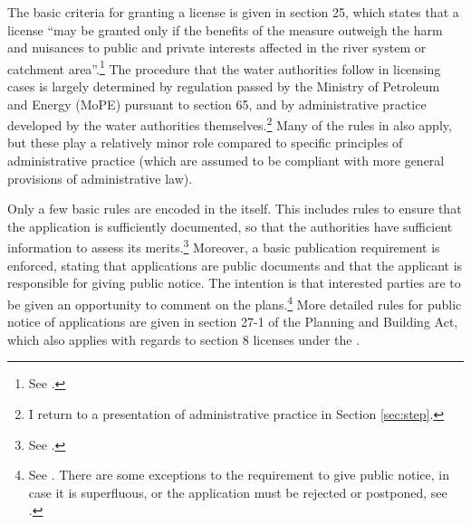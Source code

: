 The basic criteria for granting a license is given in section 25, which states that a license ``may be granted only if the benefits of the measure outweigh the harm and nuisances to public and private interests affected in the river system or catchment area''.\footnote{See \cite[25]{wra00}.} The procedure that the water authorities follow in licensing cases is largely determined by regulation passed by the Ministry of Petroleum and Energy (MoPE) pursuant to section 65, and by administrative practice developed by the water authorities themselves.\footnote{I return to a presentation of administrative practice in Section \ref{sec:step}.} Many of the rules in \cite{ac67} also apply, but these play a relatively minor role compared to specific principles of administrative practice (which are assumed to be compliant with more general provisions of administrative law).

Only a few basic rules are encoded in the \cite{wra00} itself. This includes rules to ensure that the application is sufficiently documented, so that the authorities have sufficient information to assess its merits.\footnote{See \cite[23]{wra00}.} Moreover, a basic publication requirement is enforced, stating that applications are public documents and that the applicant is responsible for giving public notice. The intention is that interested parties are to be given an opportunity to comment on the plans.\footnote{See \cite[24]{wra00}. There are some exceptions to the requirement to give public notice, in case it is superfluous, or the application must be rejected or postponed, see \cite[24a-24c]{wra00}.} More detailed rules for public notice of applications are given in section 27-1 of the Planning and Building Act, which also applies with regards to section 8 licenses under the \cite{wra00}.

